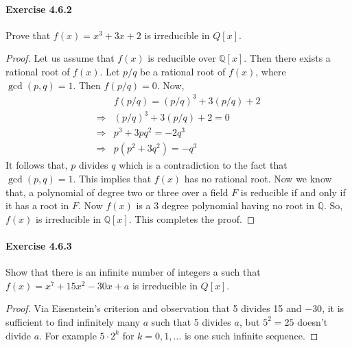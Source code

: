 \documentclass{article}
\begin{document}
\paragraph{Exercise 4.6.2} Prove that $f(x) = x^3 + 3x + 2$ is irreducible in $Q[x]$.
\begin{proof}    
Let us assume that $f(x)$ is reducible over $\mathbb{Q}[x]$.
Then there exists a rational root of $f(x)$.
Let $p / q$ be a rational root of $f(x)$, where $\operatorname{gcd}(p, q)=1$.
Then $f(p / q)=0$.
Now,
$$
\begin{aligned}
& f(p / q)=(p / q)^3+3(p / q)+2 \\
\Longrightarrow & (p / q)^3+3(p / q)+2=0 \\
\Longrightarrow & p^3+3 p q^2=-2 q^3 \\
\Longrightarrow & p\left(p^2+3 q^2\right)=-q^3
\end{aligned}
$$
It follows that, $p$ divides $q$ which is a contradiction to the fact that $\operatorname{gcd}(p, q)=1$.
This implies that $f(x)$ has no rational root.
Now we know that, a polynomial of degree two or three over a field $F$ is reducible if and only if it has a root in $F$.
Now $f(x)$ is a 3 degree polynomial having no root in $\mathbb{Q}$.
So, $f(x)$ is irreducible in $\mathbb{Q}[x]$.
This completes the proof.
\end{proof}



\paragraph{Exercise 4.6.3} Show that there is an infinite number of integers a such that $f(x) = x^7 + 15x^2 - 30x + a$ is irreducible in $Q[x]$.
\begin{proof}
    Via Eisenstein's criterion and observation that 5 divides 15 and $-30$, it is sufficient to find infinitely many $a$ such that 5 divides $a$, but $5^2=25$ doesn't divide $a$. For example $5 \cdot 2^k$ for $k=0,1, \ldots$ is one such infinite sequence.
\end{proof}
\end{document}
